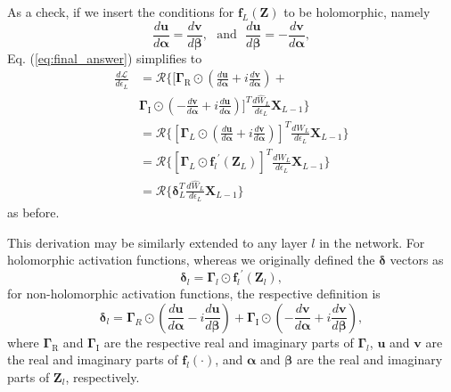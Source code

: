 As a check, if we insert the conditions for $\mathbf{f}_L(\mathbf{Z})$ to be holomorphic, namely
\begin{equation}
\frac{d\mathbf{u}}{d\boldsymbol{\alpha}} = \frac{d\mathbf{v}}{d\boldsymbol{\beta}}, ~~~\textrm{and}~~~ \frac{d\mathbf{u}}{d\boldsymbol{\beta}} = -\frac{d\mathbf{v}}{d\boldsymbol{\alpha}},
\end{equation}
Eq. (\ref{eq:final_answer}) simplifies to 
\begin{align}
\frac{d\mathcal{L}}{d\epsilon_L}
&= \mathcal{R}\Bigg\{ \Bigg[ \boldsymbol{\Gamma}_\textrm{R} \odot \left( \frac{d\mathbf{u}}{d\boldsymbol{\alpha}} + i\frac{d\mathbf{v}}{d\boldsymbol{\alpha}} \right) + \\
&\boldsymbol{\Gamma}_\textrm{I} \odot \left( -\frac{d\mathbf{v}}{d\boldsymbol{\alpha}} + i\frac{d\mathbf{u}}{d\boldsymbol{\alpha}} \right) \Bigg]^T \frac{d\hat{W}_L}{d\epsilon_L} \mathbf{X}_{L-1}
\Bigg\} \\
&= \mathcal{R}\Bigg\{ \left[ \boldsymbol{\Gamma}_L \odot \left( \frac{d\mathbf{u}}{d\boldsymbol{\alpha}} + i\frac{d\mathbf{v}}{d\boldsymbol{\alpha}} \right) \right]^T \frac{d\hat{W}_L}{d\epsilon_L} \mathbf{X}_{L-1} \Bigg\}\\
&= \mathcal{R}\Bigg\{ \left[ \boldsymbol{\Gamma}_L \odot {\mathbf{f}_l}^{'}(\mathbf{Z}_{L}) \right]^T \frac{d\hat{W}_L}{d\epsilon_L} \mathbf{X}_{L-1}
\Bigg\}\\
&= \mathcal{R}\Bigg\{ \bm{\delta}_L^T \frac{d\hat{W}_L}{d\epsilon_L} \mathbf{X}_{L-1}
\Bigg\}
\end{align}
as before.

This derivation may be similarly extended to any layer $l$ in the network.  For holomorphic activation functions, whereas we originally defined the $\boldsymbol{\delta}$ vectors as 
\begin{equation}
\boldsymbol{\delta}_l = \boldsymbol{\Gamma}_{l} \odot {\mathbf{f}_l}^{'}(\mathbf{Z}_{l}),
\label{eq:delta_def_gen}
\end{equation}
for non-holomorphic activation functions, the respective definition is 
\begin{equation}
\boldsymbol{\delta}_l = \boldsymbol{\Gamma}_R \odot \left( \frac{d\mathbf{u}}{d\boldsymbol{\alpha}} - i\frac{d\mathbf{u}}{d\boldsymbol{\beta}} \right)
 + \boldsymbol{\Gamma}_\textrm{I} \odot \left( -\frac{d\mathbf{v}}{d\boldsymbol{\alpha}} + i\frac{d\mathbf{v}}{d\boldsymbol{\beta}} \right),
\end{equation}
where $\boldsymbol{\Gamma}_\textrm{R}$ and $\boldsymbol{\Gamma}_\textrm{I}$ are the respective real and imaginary parts of $\bm{\Gamma}_l$, $\mathbf{u}$ and $\mathbf{v}$ are the real and imaginary parts of $\mathbf{f}_l(\cdot)$, and $\boldsymbol{\alpha}$ and $\boldsymbol{\beta}$ are the real and imaginary parts of $\mathbf{Z}_l$, respectively.

